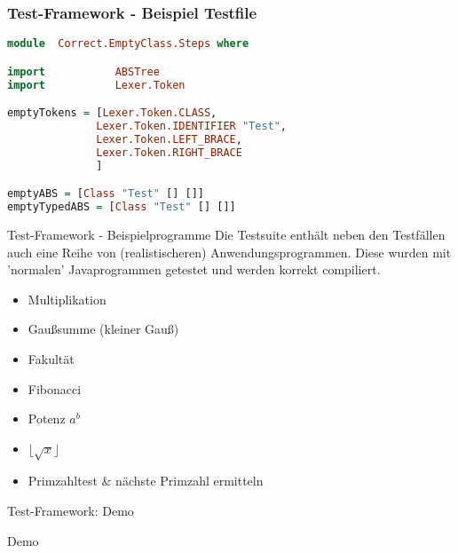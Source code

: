 \begin{frame}[fragile]
\frametitle{Test-Framework - Beispiel Testfile}
\begin{lstlisting}[language=Haskell]
module  Correct.EmptyClass.Steps where

import           ABSTree
import           Lexer.Token

emptyTokens = [Lexer.Token.CLASS,
              Lexer.Token.IDENTIFIER "Test",
              Lexer.Token.LEFT_BRACE,
              Lexer.Token.RIGHT_BRACE
              ]

emptyABS = [Class "Test" [] []]
emptyTypedABS = [Class "Test" [] []]	
\end{lstlisting}
	
\end{frame}

\begin{frame}{Test-Framework - Beispielprogramme}
Die Testsuite enthält neben den Testfällen auch eine Reihe von (realistischeren) Anwendungsprogrammen. Diese wurden mit 'normalen' Javaprogrammen getestet und werden korrekt compiliert.
\pause

\begin{itemize}
	\item Multiplikation \pause 
	\item Gaußsumme (kleiner Gauß) \pause
	\item Fakultät \pause
	\item Fibonacci \pause
	\item Potenz $a^b$ \pause 
	\item $\lfloor \sqrt{x} \rfloor$ \pause
	\item Primzahltest \& nächste Primzahl ermitteln
\end{itemize}	
\end{frame}

\begin{frame}{Test-Framework: Demo}

	\begin{center}
		\huge{Demo}
	\end{center}
\end{frame}
